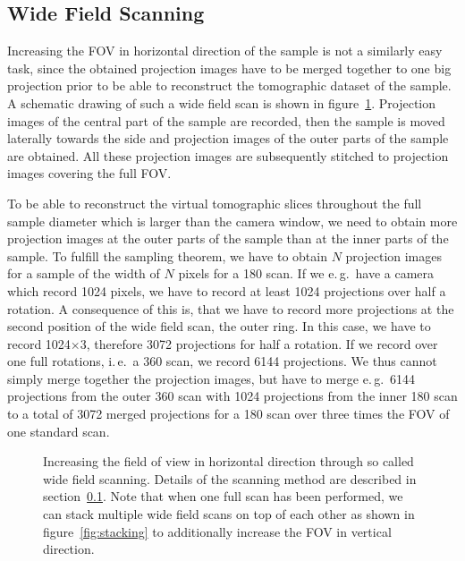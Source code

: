 \documentclass[]{scrartcl}
\begin{document}
\subsection{Wide Field Scanning}
\label{sec:wfs-details}
Increasing the FOV in horizontal direction of the sample is not a similarly easy task, since the obtained projection images have to be merged together to one big projection prior to be able to reconstruct the tomographic dataset of the sample. A schematic drawing of such a wide field scan is shown in figure~\ref{fig:wide field scan setup}. Projection images of the central part of the sample are recorded, then the sample is moved laterally towards the side and projection images of the outer parts of the sample are obtained. All these projection images are subsequently stitched to projection images covering the full FOV.

To be able to reconstruct the virtual tomographic slices throughout the full sample diameter which is larger than the camera window, we need to obtain more projection images at the outer parts of the sample than at the inner parts of the sample. To fulfill the sampling theorem, we have to obtain $N$ projection images for a sample of the width of $N$ pixels for a \unit{180}{\degree} scan. If we e.\,g.\ have a camera which record 1024 pixels, we have to record at least 1024 projections over half a rotation. A consequence of this is, that we have to record more projections at the second position of the wide field scan, the outer ring. In this case, we have to record 1024$\times$3, therefore 3072 projections for half a rotation. If we record over one full rotations, i.\,e.\ a \unit{360}{\degree} scan, we record 6144 projections. We thus cannot simply merge together the projection images, but have to merge e.\,g.\ 6144 projections from the outer \unit{360}{\degree} scan with 1024 projections from the inner \unit{180}{\degree} scan to a total of 3072 merged projections for a \unit{180}{\degree} scan over three times the FOV of one standard scan.

\begin{figure}[tb]
	\centering
		
	\caption{Increasing the field of view in horizontal direction through so called wide field scanning. Details of the scanning method are described in section~\ref{sec:wfs-details}. Note that when one full scan has been performed, we can stack multiple wide field scans on top of each other as shown in figure~\ref{fig:stacking} to additionally increase the FOV in vertical direction.}
	\label{fig:wide field scan setup}
\end{figure}
\end{document}

